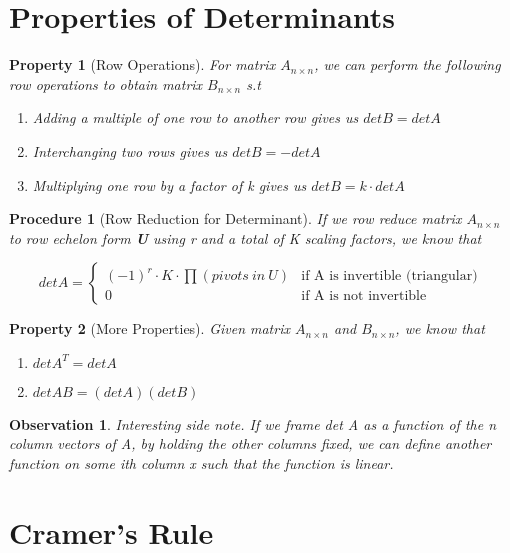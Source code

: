 \documentclass[12pt]{report}
\newtheorem{proc}{Procedure}
\newtheorem{prop}{Property}
\newtheorem{obs}{Observation}
\newcommand{\mtx}[3]{$#1_{#2\times #3}$}
\begin{document}
\section{Properties of Determinants}

\begin{prop}[Row Operations]
For matrix \mtx{A}{n}{n}, we can perform the following row operations to obtain matrix \mtx{B}{n}{n} s.t

\begin{enumerate}
\item Adding a multiple of one row to another row gives us $det B = det A$
\item Interchanging two rows gives us $det B = -det A$
\item Multiplying one row by a factor of k gives us $det B = k\cdot det A$
\end{enumerate}
\end{prop}

\begin{proc}[Row Reduction for Determinant]
If we row reduce matrix \mtx{A}{n}{n} to row echelon form \textbf{U} using \emph{r} and a total of \emph{K} scaling factors, we know that 

\begin{equation}
det A = 
\begin{cases}
(-1)^r \cdot K \cdot \prod(pivots\:in\:U) & \text{if A is invertible (triangular)} \\
0 & \text{if A is not invertible}
\end{cases}
\end{equation}

\end{proc}

\begin{prop}[More Properties]
Given matrix \mtx{A}{n}{n} and \mtx{B}{n}{n}, we know that
\begin{enumerate}
\item $det A^T = det A$
\item $det AB = (det A)(det B)$
\end{enumerate}
\end{prop}

\begin{obs}
Interesting side note. If we frame det A as a function of the n column vectors of A, by holding the other columns fixed, we can define another function on some ith column x such that the function is linear. 
\end{obs}

\section{Cramer's Rule}
\end{document}
